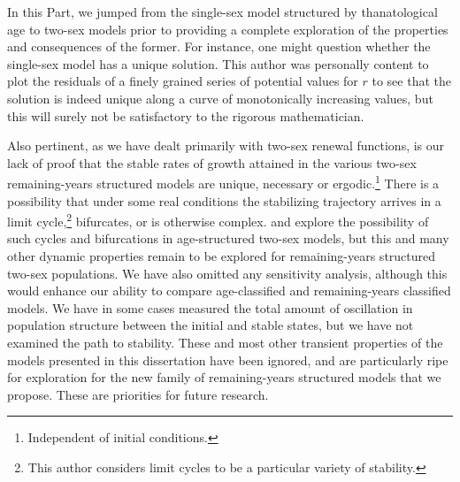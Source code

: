 \FloatBarrier
In this Part, we jumped from the single-sex model structured by
thanatological age to two-sex models prior to providing a complete
exploration of the properties and consequences of the former. For instance, one
might question whether the single-sex model has a unique solution. This author
was personally content to plot the residuals of a finely grained series of potential
values for $r$ to see that the solution is indeed unique along a curve of
monotonically increasing values, but this will surely not be satisfactory to the
rigorous mathematician.

Also pertinent, as we have dealt primarily with two-sex renewal functions,
is our lack of proof that the stable rates of growth attained in the
various two-sex remaining-years structured models are unique, necessary or
ergodic.\footnote{Independent 
of initial conditions.} There is a possibility that under some real conditions
the stabilizing trajectory arrives in a limit cycle,\footnote{This author considers 
limit cycles to be a particular variety of stability.} bifurcates, or is
otherwise complex. \citet{wijewickrema1980weak} and \citet{chung1990phd, chung1994cycles}
explore the possibility of such cycles and bifurcations in age-structured
two-sex models, but this and many other dynamic properties remain to be explored for 
remaining-years structured two-sex populations. We have also omitted any
sensitivity analysis, although this would enhance our ability to compare age-classified 
and remaining-years classified models. We have in some cases measured the total
amount of oscillation in population structure between the initial and stable states, but
we have not examined the path to stability. These and most
other transient properties of the models presented in this dissertation have
been ignored, and are particularly ripe for exploration for the new family of
remaining-years structured models that we propose. These are priorities for
future research.


